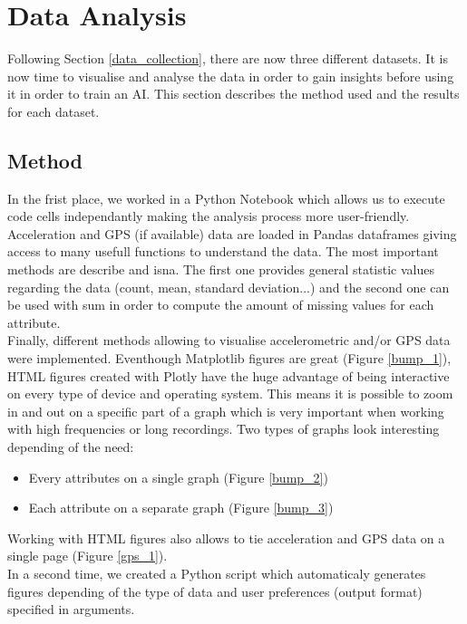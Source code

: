 \section{Data Analysis}
Following Section \ref{data_collection}, there are now three different datasets. It is now time to visualise and analyse the data in order to gain insights before using it in order to train an AI. This section describes the method used and the results for each dataset.

\subsection{Method}
In the frist place, we worked in a Python Notebook which allows us to execute code cells independantly making the analysis process more user-friendly.\\
Acceleration and GPS (if available) data are loaded in Pandas dataframes giving access to many usefull functions to understand the data. The most important methods are \textsf{describe} and \textsf{isna}. The first one provides general statistic values regarding the data (count, mean, standard deviation...) and the second one can be used with \textsf{sum} in order to compute the amount of missing values for each attribute.\\
Finally, different methods allowing to visualise accelerometric and/or GPS data were implemented. Eventhough Matplotlib figures are great (Figure \ref{bump_1}), HTML figures created with Plotly have the huge advantage of being interactive on every type of device and operating system. This means it is possible to zoom in and out on a specific part of a graph which is very important when working with high frequencies or long recordings. Two types of graphs look interesting depending of the need:
\begin{itemize}
    \item Every attributes on a single graph (Figure \ref{bump_2})
    \item Each attribute on a separate graph (Figure \ref{bump_3})
\end{itemize}
Working with HTML figures also allows to tie acceleration and GPS data on a single page (Figure \ref{gps_1}).\\

In a second time, we created a Python script which automaticaly generates figures depending of the type of data and user preferences (output format) specified in arguments.\\

